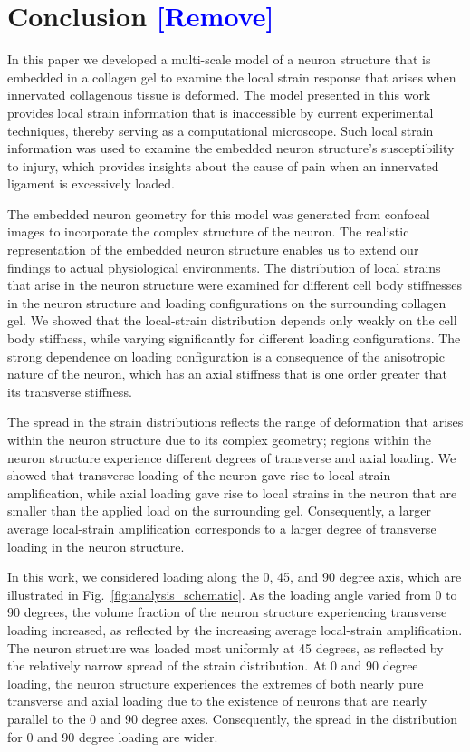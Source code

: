\documentclass[]{interact}
\newcommand{\blue}[1]{\textcolor{blue}{[#1]}}
\begin{document}
\section{Conclusion \blue{Remove}}
\label{sec:conclusion}
In this paper we developed a multi-scale model of a neuron structure that is embedded in a collagen gel to examine the local strain response that arises when innervated collagenous tissue is deformed. The model presented in this work provides local strain information that is inaccessible by current experimental techniques, thereby serving as a computational microscope. Such local strain information was used to examine the embedded neuron structure's susceptibility to injury, which provides insights about the cause of pain when an innervated ligament is excessively loaded.

The embedded neuron geometry for this model was generated from confocal images to incorporate the complex structure of the neuron. The realistic representation of the embedded neuron structure enables us to extend our findings to actual physiological environments. The distribution of local strains that arise in the neuron structure were examined for different cell body stiffnesses in the neuron structure and loading configurations on the surrounding collagen gel. We showed that the local-strain distribution depends only weakly on the cell body stiffness, while varying significantly for different loading configurations. The strong dependence on loading configuration is a consequence of the anisotropic nature of the neuron, which has an axial stiffness that is one order greater that its transverse stiffness.

The spread in the strain distributions reflects the range of deformation that arises within the neuron structure due to its complex geometry; regions within the neuron structure experience different degrees of transverse and axial loading. We showed that transverse loading of the neuron gave rise to local-strain amplification, while axial loading gave rise to local strains in the neuron that are smaller than the applied load on the surrounding gel. Consequently, a larger average local-strain amplification corresponds to a larger degree of transverse loading in the neuron structure.

In this work, we considered loading along the 0, 45, and 90 degree axis, which are illustrated in Fig.\ \ref{fig:analysis_schematic}. As the loading angle varied from 0 to 90 degrees, the volume fraction of the neuron structure experiencing transverse loading increased, as reflected by the increasing average local-strain amplification. The neuron structure was loaded most uniformly at 45 degrees, as reflected by the relatively narrow spread of the strain distribution. At 0 and 90 degree loading, the neuron structure experiences the extremes of both nearly pure transverse and axial loading due to the existence of neurons that are nearly parallel to the 0 and 90 degree axes. Consequently, the spread in the distribution for 0 and 90 degree loading are wider.
\end{document}
